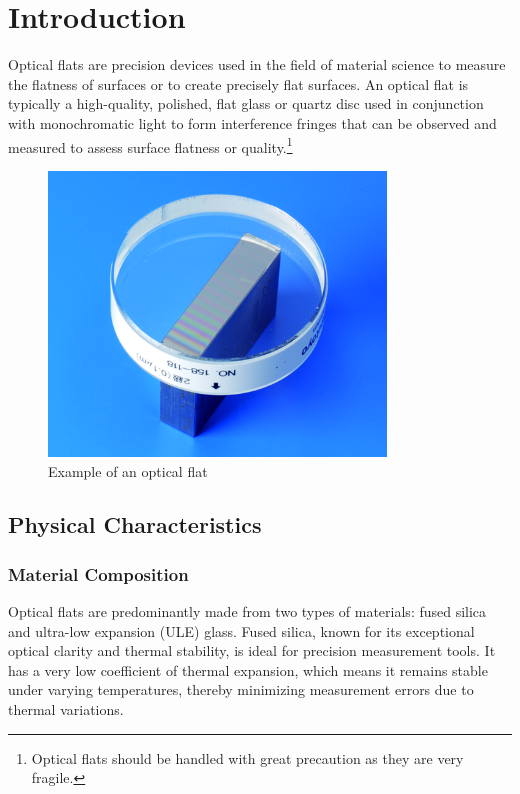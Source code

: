 \documentclass[../main.tex]{subfiles}
\begin{document}
\chapter{Introduction}
Optical flats are precision devices used in the field of material science to measure the flatness of surfaces or to create precisely flat surfaces. An optical flat is typically a high-quality, polished, flat glass or quartz disc used in conjunction with monochromatic light to form interference fringes that can be observed and measured to assess surface flatness or quality.\footnote{Optical flats should be handled with great precaution as they are very fragile.} \cite{edmund_optics_optical_flats, kemet_optical_flats, lapmaster_wolters_optical_flats,Paschottaoptical_flats}

\begin{frame}{}
    \begin{figure}[h]
        \centering
        \includegraphics[width=0.8\textwidth]{Images/Introduction/optical_flat}
        \caption{Example of an optical flat \cite{optical_flat_mitutoyo}}
        \label{fig:optical_flat_example}
    \end{figure}
\end{frame}

\section{Physical Characteristics}
\subsection{Material Composition}
Optical flats are predominantly made from two types of materials: fused silica and ultra-low expansion (ULE) glass. Fused silica, known for its exceptional optical clarity and thermal stability, is ideal for precision measurement tools. It has a very low coefficient of thermal expansion, which means it remains stable under varying temperatures, thereby minimizing measurement errors due to thermal variations.\cite{Paschottafused_silica}
\end{document}
